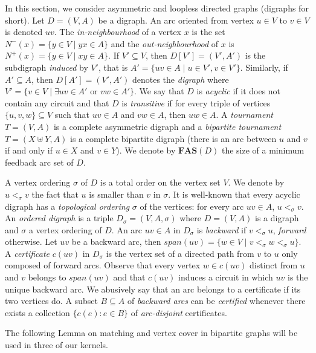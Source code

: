 

In this section, we consider asymmetric and loopless directed graphs (digraphs for short). Let $D=(V,A)$ be a digraph. An arc oriented from vertex $u\in V$ to $v\in V$ is denoted $uv$. The \emph{in-neighbourhood} of a vertex $x$ is the set $N^-(x)=\{y\in V\mid yx\in A\}$ and the \emph{out-neighbourhood} of $x$ is $N^+(x)=\{y\in V\mid xy\in A\}$. If $V'\subseteq V$, then $D[V']=(V',A')$ is the subdigraph \emph{induced} by $V'$, that is $A'=\{uv \in A\mid u\in V', v\in V'\}$. Similarly, if $A'\subseteq A$, then $D[A']=(V',A')$ denotes the \emph{digraph} where $V'=\{v\in V\mid \exists uv\in A' \mbox{ or } vw\in A'\}$. We say that $D$ is \emph{acyclic} if it does not contain any circuit and that $D$ is \emph{transitive} if for every triple of vertices $\{u, v, w\}\subseteq V$ such that $uv\in A$ and $vw\in A$, then $uw\in A$. A \emph{tournament} $T=(V,A)$ is a complete asymmetric digraph and a \emph{bipartite tournament} $T=(X\uplus Y,A)$ is a complete bipartite digraph (there is an arc between $u$ and $v$ if and only if $u\in X$ and $v\in Y$). We denote by $\mathbf{FAS}(D)$ the size of a minimum feedback arc set of $D$.

A vertex ordering $\sigma$ of $D$ is a total order on the vertex set $V$. We denote by $u<_{\sigma} v$ the fact that $u$ is smaller than $v$ in $\sigma$. It is well-known that every acyclic digraph has a \emph{topological ordering} $\sigma$ of the vertices: for every arc $uv\in A$, $u<_{\sigma} v$. An \emph{ordered digraph} is a triple $D_{\sigma}=(V,A,\sigma)$ where $D=(V,A)$ is a digraph and $\sigma$ a vertex ordering of $D$. An arc $uv\in A$ in $D_{\sigma}$ is \emph{backward} if $v<_{\sigma} u$, \emph{forward} otherwise. Let $uv$ be a backward arc, then $span(uv)=\{w\in V\mid v<_{\sigma} w<_{\sigma} u\}$. A \emph{certificate} $c(uv)$ in $D_{\sigma}$ is the vertex set of a directed path from $v$ to $u$ only composed of forward arcs. Observe that every vertex $w\in c(uv)$ distinct from $u$ and $v$ belongs to $span(uv)$ and that $c(uv)$ induces a circuit in which $uv$ is the unique backward arc. We abusively say that an arc  belongs to a certificate if its two vertices do. A subset $B \subseteq A$ of \emph{backward arcs} can be \emph{certified} whenever there exists a collection $\{c(e) : e \in B\}$ of \emph{arc-disjoint} certificates.


The following Lemma on matching and vertex cover in bipartite graphs will be used in three of our kernels.

